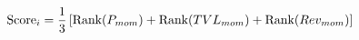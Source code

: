 \documentclass[preview]{standalone}
\begin{document}
\begin{align*}
\special{dvisvgm:raw <g id='unique000'>}\text{Score}_i = \frac{1}{3}\left[\text{Rank}(P_{mom}) + \text{Rank}(TVL_{mom}) + \text{Rank}(Rev_{mom})\right]\special{dvisvgm:raw </g>}
\end{align*}
\end{document}
